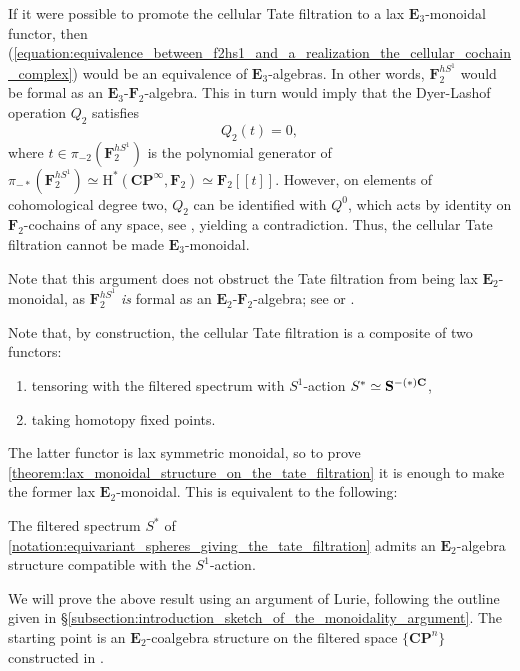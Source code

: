 \documentclass[oneside,a4paper]{amsart}
\begin{document}
\begin{warning}
If it were possible to promote the cellular Tate filtration to a lax $\mathbf{E}_{3}$-monoidal functor, then (\ref{equation:equivalence_between_f2hs1_and_a_realization_the_cellular_cochain_complex}) would be an equivalence of $\mathbf{E}_{3}$-algebras. In other words, $\mathbf{F}_{2}^{hS^{1}}$ would be formal as an $\mathbf{E}_{3}$-$\mathbf{F}_{2}$-algebra. This in turn would imply that the Dyer-Lashof operation $Q_{2}$ satisfies 
\[
Q_{2}(t) = 0, 
\]
where $t \in \pi_{-2}(\mathbf{F}_{2}^{hS^{1}})$ is the polynomial generator of $\pi_{-\ast}(\mathbf{F}_{2}^{hS^{1}}) \simeq \mathrm{H}^{\ast}(\mathbf{CP}^{\infty}, \mathbf{F}_{2}) \simeq \mathbf{F}_{2} [\![t]\!]$. However, on elements of cohomological degree two, $Q_{2}$ can be identified with $Q^{0}$, which acts by identity on $\mathbf{F}_{2}$-cochains of any space, see \cite[{Example 5.9}]{lawson2020n}, yielding a contradiction. Thus, the cellular Tate filtration cannot be made $\mathbf{E}_{3}$-monoidal. 

Note that this argument does not obstruct the Tate filtration from being lax $\mathbf{E}_{2}$-monoidal, as $\mathbf{F}_{2}^{hS^{1}}$ \emph{is} formal as an $\mathbf{E}_{2}$-$\mathbf{F}_{2}$-algebra; see  \cite[Lemma 2.1.10]{devalapurkar2024ku} or \cite[{Theorem 3.5}]{horel2025e_2}. 
\end{warning}

Note that, by construction, the cellular Tate filtration is a composite of two functors: 
\begin{enumerate}
    \item tensoring with the filtered spectrum with $S^{1}$-action $S^{\ast} \simeq \mathbf{S}^{-(\ast)\mathbf{C}}$, 
    \item taking homotopy fixed points. 
\end{enumerate}

The latter functor is lax symmetric monoidal, so to prove \cref{theorem:lax_monoidal_structure_on_the_tate_filtration} it is enough to make the former lax $\mathbf{E}_{2}$-monoidal. This is equivalent to the following: 

\begin{theorem}
\label{theorem:suspension_spectra_of_complex_numbers_admits_a_filtered_e2_algebra_structure}
The filtered spectrum $S^{\ast}$ of \cref{notation:equivariant_spheres_giving_the_tate_filtration} admits an $\mathbf{E}_{2}$-algebra structure compatible with the $S^{1}$-action. 
\end{theorem}

We will prove the above result using an argument of Lurie, following the outline given in \S\ref{subsection:introduction_sketch_of_the_monoidality_argument}. The starting point is an $\mathbf{E}_{2}$-coalgebra structure on the filtered space $\{ \mathbf{CP}^{n} \}$ constructed in \cite[{Theorem 5.2.3}]{lurie2015rotation}. 
\end{document}
